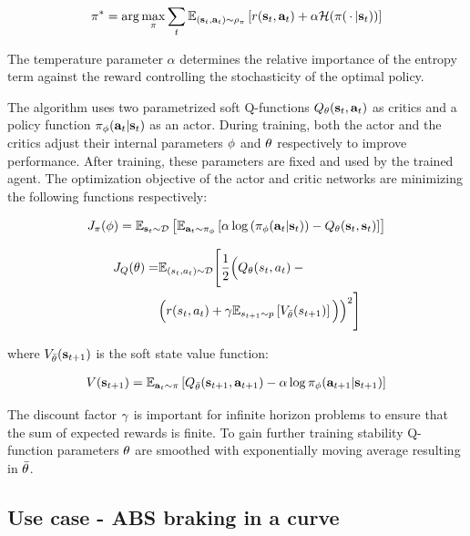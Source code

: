 \documentclass[a4paper, fleqn]{template/cas-dc}
\begin{document}
	\begin{align}
		\label{eq:sql:maxent_objective}
		\pi^* = \arg\max_{\pi} \sum_{t} \operatorname{\mathbb{E}}_{({\mathbf{s}_t}, {\mathbf{a}_t}) \sim \rho_\pi}\left[r({\mathbf{s}_t},{\mathbf{a}_t}) + \alpha\mathcal{H}(\pi({\,\cdot\,}|{\mathbf{s}_t}))\right]
	\end{align}
	
	The temperature parameter $\alpha$ determines the relative importance of the entropy term against the reward controlling the stochasticity of the optimal policy.
	
	The algorithm uses two parametrized soft Q-functions $Q_\theta({\mathbf{s}_t}, {\mathbf{a}_t})$ as critics and a policy function  $\pi_{\phi}({\mathbf{a}_t}|{\mathbf{s}_t})$ as an actor. During training, both the actor and the critics adjust their internal parameters ${\phi}$ and $\theta$ respectively to improve performance. After training, these parameters are fixed and used by the trained agent. The optimization objective of the actor and critic networks are minimizing the following functions respectively:
	
	\begin{align}
		J_\pi({\phi}) = \operatorname{\mathbb{E}}_{{\mathbf{s}_t}\sim\mathcal{D}}\left[\operatorname{\mathbb{E}}_{{\mathbf{a}_t}\sim\pi_{\phi}}\left[\alpha \log\left(\pi_{\phi}({\mathbf{a}_t}|{\mathbf{s}_t})\right) - Q_\theta({\mathbf{s}_t}, {\mathbf{s}_t})\right]\right]
	\end{align}
	
	\begin{align}				
		J_Q(\theta) = &\mathbb{E}_{(s_t,a_t)\sim\mathcal{D}} \Bigg[ \frac{1}{2} \Big( Q_\theta(s_t, a_t) - {} \notag \\
		&\Big( r(s_t,a_t) + \gamma \mathbb{E}_{s_{t+1}\sim p} \left[ V_{\bar{\theta}}(s_{t+1}) \right] \Big) \Big)^2 \Bigg]							
		\label{eq:q_cost}		
	\end{align}
	
	where $V_{\bar{\theta}}({\mathbf{s}_{t+1}})$ is the soft state value function:
	
	\begin{align}
		V({\mathbf{s}_{t+1}}) = \operatorname{\mathbb{E}}_{{\mathbf{a}_t}\sim\pi}\left[Q_{\bar{\theta}}({\mathbf{s}_{t+1}}, {\mathbf{a}_{t+1}}) - \alpha\log\pi_{\phi}({\mathbf{a}_{t+1}}|{\mathbf{s}_{t+1}})\right]
	\end{align}
	
	The discount factor $\gamma$ is important for infinite horizon problems to ensure that the sum of expected rewards is finite. To gain further training stability Q-function parameters $\theta$ are smoothed with exponentially moving average resulting in $\bar{\theta}$.
		
	\subsection{Use case - ABS braking in a curve}
	
\end{document}
